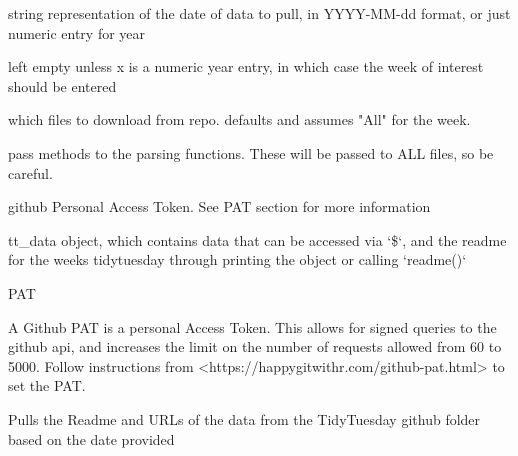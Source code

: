 \documentclass[letterpaper]{book}
\begin{document}
\begin{Arguments}
\begin{ldescription}
\item[\code{x}] string representation of the date of data to pull, in YYYY-MM-dd
format, or just numeric entry for year

\item[\code{week}] left empty unless x is a numeric year entry, in which case the
week of interest should be entered

\item[\code{download\_files}] which files to download from repo. defaults and
assumes "All" for the week.

\item[\code{...}] pass methods to the parsing functions. These will be passed to
ALL files, so be careful.

\item[\code{auth}] github Personal Access Token. See PAT section for more
information
\end{ldescription}
\end{Arguments}
%
\begin{Value}
tt\_data object, which contains data that can be accessed via `\$`,
and the readme for the weeks tidytuesday through printing the object or
calling `readme()`
\end{Value}
%
\begin{Section}{PAT}

A Github PAT is a personal Access Token. This allows for signed queries to
the github api, and increases the limit on the number of requests allowed
from 60 to 5000. Follow instructions from
<https://happygitwithr.com/github-pat.html> to set the PAT.
\end{Section}
%
\begin{Examples}
\end{Examples}
%
\begin{Description}\relax
Pulls the Readme and URLs of the data from the TidyTuesday
github folder based on the date provided
\end{Description}
\end{document}

